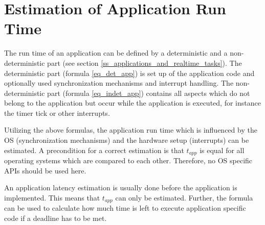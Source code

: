 \section{Estimation of Application Run Time}
The run time of an application can be defined by a deterministic and a non-deterministic part (see section \ref{ss_applications_and_realtime_tasks}). 
The deterministic part (formula \ref{eq_det_app}) is set up of the application code and optionally used synchronization mechanisms and interrupt handling.
The non-deterministic part (formula \ref{eq_indet_app}) contains all aspects which do not belong to the application but occur while the application is executed, for instance the timer tick or other interrupts.  
\par
Utilizing the above formulas, the application run time which is influenced by the \ac{OS} (synchronization mechanisms) and the hardware setup (interrupts) can be estimated. 
A precondition for a correct estimation is that $t_{app}$ is equal for all operating systems which are compared to each other. 
Therefore, no \ac{OS} specific \acp{API} should be used here.
\par
An application latency estimation is usually done before the application is implemented. 
This means that $t_{app}$ can only be estimated. 
Further, the formula can be used to calculate how much time is left to execute application specific code if a deadline has to be met. 





